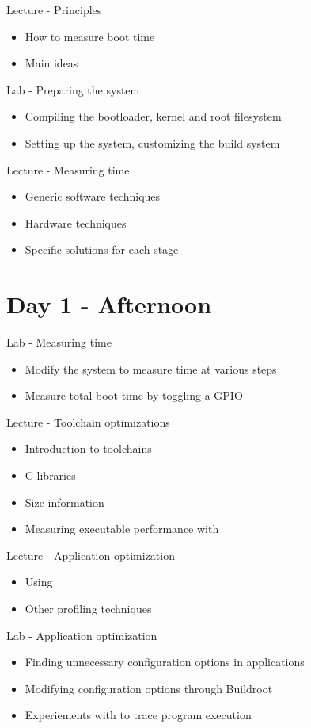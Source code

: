 \documentclass[a4paper,12pt,obeyspaces,spaces,hyphens]{article}
\begin{document}
\feagendatwocolumn
{Lecture - Principles}
{
  \begin{itemize}
  \item How to measure boot time
  \item Main ideas
  \end{itemize}
}
{Lab - Preparing the system}
{
 \begin{itemize}
 \item Compiling the bootloader, kernel and root filesystem
 \item Setting up the system, customizing the build system
 \end{itemize}
}

\feagendaonecolumn
{Lecture - Measuring time}
{
  \begin{itemize}
  \item Generic software techniques
  \item Hardware techniques
  \item Specific solutions for each stage
  \end{itemize}
}


\section{Day 1 - Afternoon}

\feagendatwocolumn
{Lab - Measuring time}
{
 \begin{itemize}
 \item Modify the system to measure time at various steps
 \item Measure total boot time by toggling a GPIO
 \end{itemize}
}
{Lecture - Toolchain optimizations}
{
  \begin{itemize}
  \item Introduction to toolchains
  \item C libraries
  \item Size information
  \item Measuring executable performance with 
  \end{itemize}
}

\feagendatwocolumn
{Lecture - Application optimization}
{
  \begin{itemize}
  \item Using 
  \item Other profiling techniques
  \end{itemize}
}
{Lab - Application optimization}
{
 \begin{itemize}
 \item Finding unnecessary configuration options in applications
 \item Modifying configuration options through Buildroot
 \item Experiements with  to trace program execution
 \end{itemize}
}
\end{document}
